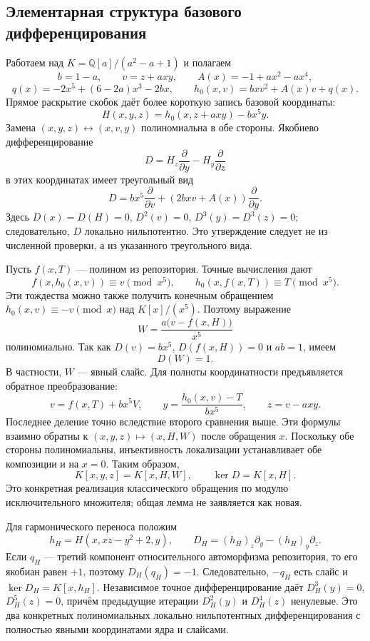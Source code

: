 \subsection{Элементарная структура базового дифференцирования}
Работаем над $K=\mathbb Q[a]/(a^2-a+1)$ и полагаем
\[
b=1-a,\qquad v=z+axy,\qquad
A(x)=-1+ax^2-ax^4,
\]
\[
q(x)=-2x^5+(6-2a)x^3-2bx,
\qquad h_0(x,v)=bxv^2+A(x)v+q(x).
\]
Прямое раскрытие скобок даёт более короткую запись базовой координаты:
\[
H(x,y,z)=h_0(x,z+axy)-bx^5y.
\]
Замена $(x,y,z)\leftrightarrow(x,v,y)$ полиномиальна в обе стороны.
Якобиево дифференцирование
\[
D=H_z\frac{\partial}{\partial y}-H_y\frac{\partial}{\partial z}
\]
в этих координатах имеет треугольный вид
\[
\boxed{D=bx^5\frac{\partial}{\partial v}
       +(2bxv+A(x))\frac{\partial}{\partial y}.}
\]
Здесь $D(x)=D(H)=0$, $D^2(v)=0$, $D^3(y)=D^3(z)=0$;
следовательно, $D$ локально нильпотентно. Это утверждение следует
не из численной проверки, а из указанного треугольного вида.

Пусть $f(x,T)$ --- полином из репозитория. Точные вычисления дают
\[
f(x,h_0(x,v))\equiv v\pmod{x^5},\qquad
h_0(x,f(x,T))\equiv T\pmod{x^5}.
\]
Эти тождества можно также получить конечным обращением
$h_0(x,v)\equiv-v\pmod{x}$ над $K[x]/(x^5)$.
Поэтому выражение
\[
W=\frac{a\bigl(v-f(x,H)\bigr)}{x^5}
\]
полиномиально. Так как $D(v)=bx^5$, $D(f(x,H))=0$ и $ab=1$, имеем
\[
\boxed{D(W)=1.}
\]
В частности, $W$ --- явный слайс. Для полноты координатности
предъявляется обратное преобразование:
\[
v=f(x,T)+bx^5V,\qquad
y=\frac{h_0(x,v)-T}{bx^5},\qquad z=v-axy.
\]
Последнее деление точно вследствие второго сравнения выше.
Эти формулы взаимно обратны к $(x,y,z)\mapsto(x,H,W)$ после
обращения $x$. Поскольку обе стороны полиномиальны, инъективность
локализации устанавливает обе композиции и на $x=0$.
Таким образом,
\[
K[x,y,z]=K[x,H,W],\qquad \ker D=K[x,H].
\]
Это конкретная реализация классического обращения по модулю
исключительного множителя; общая лемма не заявляется как новая.

Для гармонического переноса положим
\[
h_H=H(x,xz-y^2+2,y),\qquad
D_H=(h_H)_z\partial_y-(h_H)_y\partial_z.
\]
Если $q_H$ --- третий компонент относительного автоморфизма
репозитория, то его якобиан равен $+1$, поэтому
$D_H(q_H)=-1$. Следовательно, $-q_H$ есть слайс и
$\ker D_H=K[x,h_H]$. Независимое точное дифференцирование даёт
$D_H^3(y)=0$, $D_H^5(z)=0$, причём предыдущие итерации
$D_H^2(y)$ и $D_H^4(z)$ ненулевые. Это два конкретных
полиномиальных локально нильпотентных дифференцирования с
полностью явными координатами ядра и слайсами.
